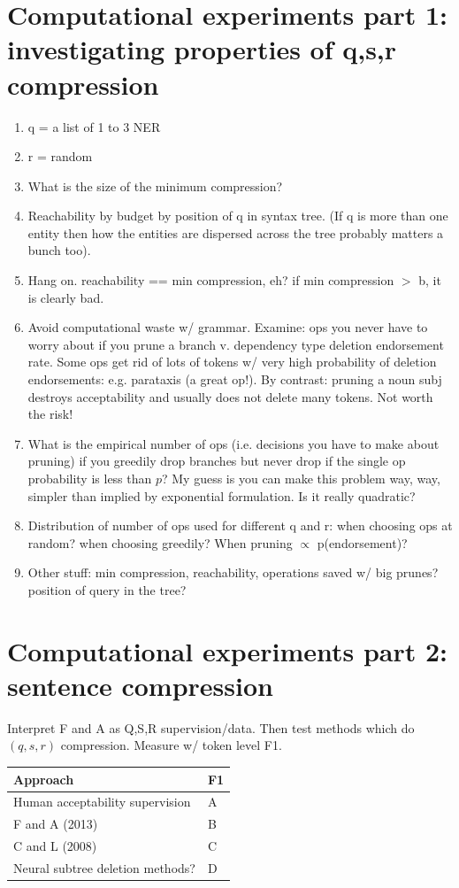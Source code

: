 \documentclass[11pt,a4paper]{article}
\begin{document}
\section{Computational experiments part 1: investigating properties of q,s,r compression}
\begin{enumerate}
\item{q = a list of 1 to 3 NER}
\item{r = random}
\item{What is the size of the minimum compression?}
\item{Reachability by budget by position of q in syntax tree. (If q is more than one entity then how the entities are dispersed across the tree probably matters a bunch too).}
\item{Hang on. reachability == min compression, eh? if min compression $>$ b, it is clearly bad.}
\item{Avoid computational waste w/ grammar.  Examine: ops you never have to worry about if you prune a branch v. dependency type deletion endorsement rate. Some ops get rid of lots of tokens w/ very high probability of deletion endorsements: e.g. parataxis (a great op!). By contrast: pruning a noun subj destroys acceptability and usually does not delete many tokens. Not worth the risk!}
\item{What is the empirical number of ops (i.e. decisions you have to make about pruning) if you greedily drop branches but never drop if the single op probability is less than $p$? My guess is you can make this problem way, way, simpler than implied by exponential formulation. Is it really quadratic?}
\item{Distribution of number of ops used for different q and r: when choosing ops at random? when choosing greedily? When pruning $\propto$ p(endorsement)?}
\item{Other stuff: min compression, reachability, operations saved w/ big prunes? position of query in the tree?}
\end{enumerate}

\section{Computational experiments part 2: sentence compression}
Interpret F and A as Q,S,R supervision/data. Then test methods which do $(q,s,r)$ compression. Measure w/ token level F1.


\begin{table}[htb!]
\begin{tabular}{ll}
\centering
Approach & F1 \\ \hline
Human acceptability supervision         &  A          \\
F and A (2013)    & B           \\
C and L (2008)    & C        \\
Neural subtree deletion methods? &  D    \\   
\end{tabular}
\end{table}
\end{document}
